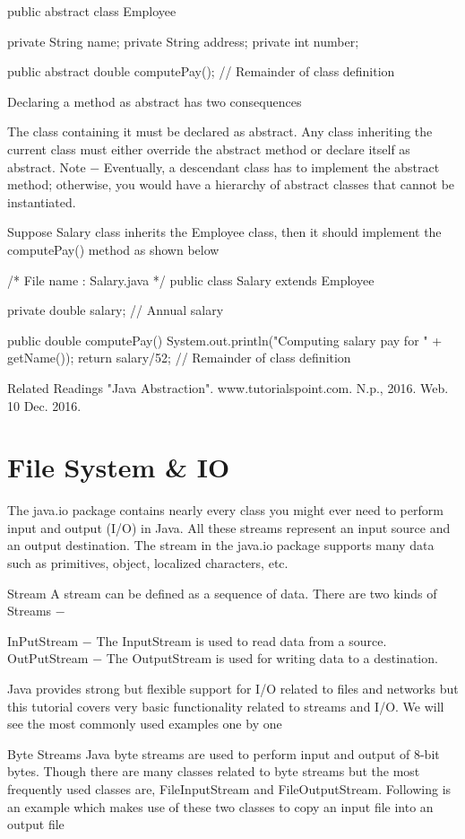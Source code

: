 public abstract class Employee {
   private String name;
   private String address;
   private int number;

   public abstract double computePay();
   // Remainder of class definition
}
Declaring a method as abstract has two consequences

The class containing it must be declared as abstract.
Any class inheriting the current class must either override the abstract method or declare itself as abstract.
Note − Eventually, a descendant class has to implement the abstract method; otherwise, you would have a hierarchy of abstract classes that cannot be instantiated.

Suppose Salary class inherits the Employee class, then it should implement the computePay() method as shown below

/* File name : Salary.java */
public class Salary extends Employee {
   private double salary;   // Annual salary

   public double computePay() {
      System.out.println("Computing salary pay for " + getName());
      return salary/52;
   }
   // Remainder of class definition
}
Related Readings
"Java Abstraction". www.tutorialspoint.com. N.p., 2016. Web. 10 Dec. 2016.

\section{File System & IO}

The java.io package contains nearly every class you might ever need to perform input and output (I/O) in Java. All these streams represent an input source and an output destination. The stream in the java.io package supports many data such as primitives, object, localized characters, etc.

Stream
A stream can be defined as a sequence of data. There are two kinds of Streams −

InPutStream − The InputStream is used to read data from a source.
OutPutStream − The OutputStream is used for writing data to a destination.


Java provides strong but flexible support for I/O related to files and networks but this tutorial covers very basic functionality related to streams and I/O. We will see the most commonly used examples one by one

Byte Streams
Java byte streams are used to perform input and output of 8-bit bytes. Though there are many classes related to byte streams but the most frequently used classes are, FileInputStream and FileOutputStream. Following is an example which makes use of these two classes to copy an input file into an output file

